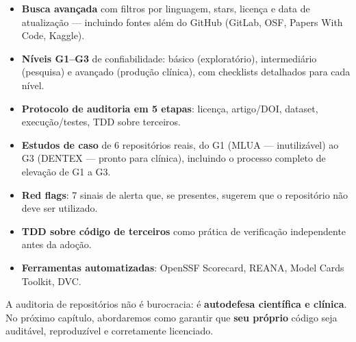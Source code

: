 \begin{itemize}
  \item \textbf{Busca avançada} com filtros por linguagem, stars, licença
    e data de atualização — incluindo fontes além do GitHub (GitLab, OSF,
    Papers With Code, Kaggle).

  \item \textbf{Níveis G1--G3} de confiabilidade: básico (exploratório),
    intermediário (pesquisa) e avançado (produção clínica), com checklists
    detalhados para cada nível.

  \item \textbf{Protocolo de auditoria em 5 etapas}: licença, artigo/DOI,
    dataset, execução/testes, TDD sobre terceiros.

  \item \textbf{Estudos de caso} de 6 repositórios reais, do G1 (MLUA —
    inutilizável) ao G3 (DENTEX — pronto para clínica), incluindo o
    processo completo de elevação de G1 a G3.

  \item \textbf{Red flags}: 7 sinais de alerta que, se presentes, sugerem
    que o repositório não deve ser utilizado.

  \item \textbf{TDD sobre código de terceiros} como prática de verificação
    independente antes da adoção.

  \item \textbf{Ferramentas automatizadas}: OpenSSF Scorecard, REANA,
    Model Cards Toolkit, DVC.
\end{itemize}

A auditoria de repositórios não é burocracia: é \textbf{autodefesa
científica e clínica}. No próximo capítulo, abordaremos como garantir
que \textbf{seu próprio} código seja auditável, reproduzível e
corretamente licenciado.
